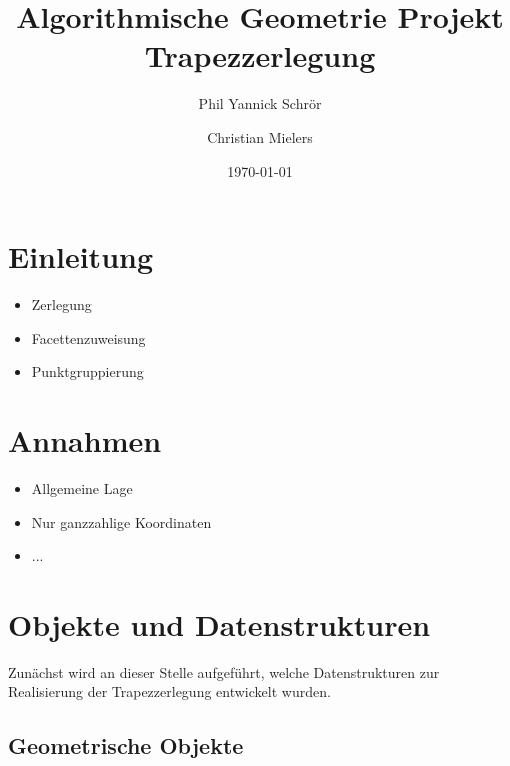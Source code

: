 \documentclass[11pt, a4paper]{article}
\title{Algorithmische Geometrie Projekt \\ Trapezzerlegung}
\author{Phil Yannick Schrör \and Christian Mielers}
\date{\today}
\begin{document}
\maketitle

\section{Einleitung}

\begin{itemize}
\item Zerlegung
\item Facettenzuweisung
\item Punktgruppierung
\end{itemize}

\section{Annahmen}

\begin{itemize}
\item Allgemeine Lage
\item Nur ganzzahlige Koordinaten
\item ...
\end{itemize}

\section{Objekte und Datenstrukturen}

Zunächst wird an dieser Stelle aufgeführt, welche Datenstrukturen zur Realisierung der Trapezzerlegung entwickelt wurden.

\subsection{Geometrische Objekte}
\end{document}
